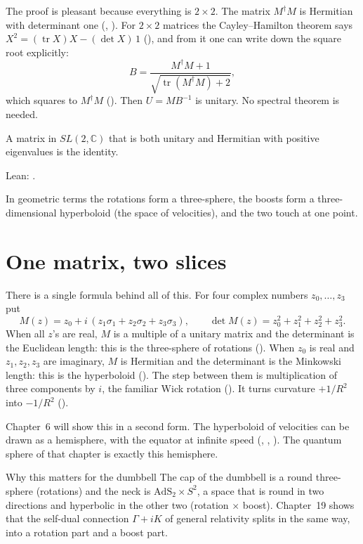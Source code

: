 The proof is pleasant because everything is $2\times2$. The matrix $M^\dagger M$ is Hermitian with determinant one (, ). For $2\times2$ matrices the Cayley--Hamilton theorem says $X^2=(\operatorname{tr}X)X-(\det X)\,1$ (), and from it one can write down the square root explicitly:
\[
B=\frac{M^\dagger M+1}{\sqrt{\operatorname{tr}(M^\dagger M)+2}} ,
\]
which squares to $M^\dagger M$ (). Then $U=MB^{-1}$ is unitary. No spectral theorem is needed.

\begin{proposition}\proved
A matrix in $SL(2,\mathbb C)$ that is both unitary and Hermitian with positive eigenvalues is the identity.
\end{proposition}
\noindent Lean: .

In geometric terms the rotations form a three-sphere, the boosts form a three-dimensional hyperboloid (the space of velocities), and the two touch at one point.

\section{One matrix, two slices}

There is a single formula behind all of this. For four complex numbers $z_0,\dots,z_3$ put
\[
M(z)=z_0+i\,(z_1\sigma_1+z_2\sigma_2+z_3\sigma_3),\qquad \det M(z)=z_0^2+z_1^2+z_2^2+z_3^2 .
\]
When all $z$'s are real, $M$ is a multiple of a unitary matrix and the determinant is the Euclidean length: this is the three-sphere of rotations (). When $z_0$ is real and $z_1,z_2,z_3$ are imaginary, $M$ is Hermitian and the determinant is the Minkowski length: this is the hyperboloid (). The step between them is multiplication of three components by $i$, the familiar Wick rotation (). It turns curvature $+1/R^2$ into $-1/R^2$ ().

Chapter~6 will show this in a second form. The hyperboloid of velocities can be drawn as a hemisphere, with the equator at infinite speed (, , ). The quantum sphere of that chapter is exactly this hemisphere.

\begin{asidebox}{Why this matters for the dumbbell}
The cap of the dumbbell is a round three-sphere (rotations) and the neck is $\mathrm{AdS}_2\times S^2$, a space that is round in two directions and hyperbolic in the other two (rotation $\times$ boost). Chapter~19 shows that the self-dual connection $\Gamma+iK$ of general relativity splits in the same way, into a rotation part and a boost part.
\end{asidebox}

